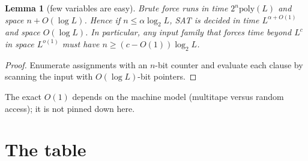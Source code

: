 \documentclass[11pt]{article}
\newtheorem{lemma}{Lemma}
\begin{document}
\begin{lemma}[few variables are easy]\label{lem:dense}
Brute force runs in time $2^{n}\mathrm{poly}(L)$ and space $n+O(\log L)$. Hence if $n\le\alpha\log_2L$, SAT is decided in time $L^{\alpha+O(1)}$ and space $O(\log L)$. In particular, any input family that forces time beyond $L^{c}$ in space $L^{o(1)}$ must have $n\ge(c-O(1))\log_2L$.
\end{lemma}
\begin{proof}
Enumerate assignments with an $n$-bit counter and evaluate each clause by scanning the input with $O(\log L)$-bit pointers.
\end{proof}
The exact $O(1)$ depends on the machine model (multitape versus random access); it is not pinned down here.

\section{The table}
\end{document}
